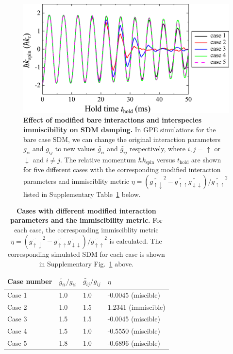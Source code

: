 \documentclass[showpacs,preprintnumbers,amsmath,amssymb, superscriptaddress, aps, reprint]{revtex4-1}
\def\thold{t_{\text{hold}}}
\begin{document}
{{\vspace{3mm}
\begin{figure}[ht]
\centering
\includegraphics[width=5.4in]{SI_Fig4_miscibility_Vfinal.pdf}
\caption{\textbf{Effect of modified bare interactions and interspecies immiscibility on SDM damping.} In GPE simulations for the bare case SDM, we can change the original interaction parameters $g_{ii}$ and $g_{ij}$ to new values $\tilde{g_{ii}}$ and $\tilde{g_{ij}}$ respectively, where $i,j = \uparrow$ or $\downarrow$ and $i\neq j$. The relative momentum $\hbar k_{\text{spin}}$ versus $\thold$ are shown for five different cases with the corresponding modified interaction parameters and immisciblity metric $\eta=(\tilde{g_{\uparrow\downarrow}}^2-\tilde{g_{\uparrow\uparrow}}\tilde{g_{\downarrow\downarrow}})/\tilde{g_{\uparrow\uparrow}}^2$ listed in Supplementary Table~\ref{table1} below.}
\label{fig_GPE_miscibility}
\end{figure}

\vspace{3mm}
\begin{table}[ht]
\centering
\begin{tabular}{ | p{2.0cm} | p{1.0cm} | p{1.0cm} | p{3.0cm} |}
    \hline
Case number & $\tilde{g_{ii}}/g_{ii}$ & $\tilde{g_{ij}}/g_{ij}$ & $\eta$ \\ \hline 
Case 1  & 1.0 & 1.0 & -0.0045 (miscible) \\ \hline
Case 2  & 1.0 & 1.5 & 1.2341 (immiscible)\\ \hline
Case 3  & 1.5 & 1.5 & -0.0045 (miscible) \\ \hline
Case 4  & 1.5 & 1.0 & -0.5550 (miscible) \\ \hline
Case 5  & 1.8 & 1.0 & -0.6896 (miscible) \\
    \hline
\end{tabular}
\caption{\textbf{Cases with different modified interaction parameters and the immiscibility metric.} For each case, the corresponding immisciblity metric $\eta=(\tilde{g_{\uparrow\downarrow}}^2-\tilde{g_{\uparrow\uparrow}}\tilde{g_{\downarrow\downarrow}})/\tilde{g_{\uparrow\uparrow}}^2$ is calculated. The corresponding simulated SDM for each case is shown in Supplementary Fig.~\ref{fig_GPE_miscibility} above.} \label{table1} 
\end{table}



}}
\end{document}
